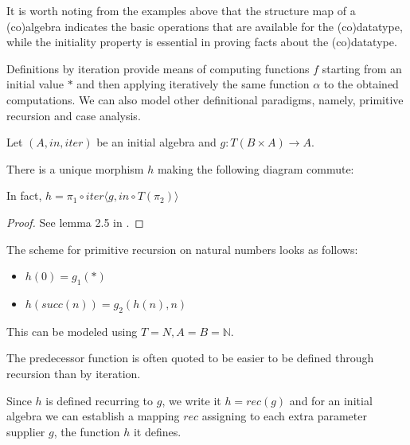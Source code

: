 It is worth noting from the examples above that the structure map of a (co)algebra indicates the basic operations that are available for the (co)datatype, while the initiality property is essential in proving facts about the (co)datatype. \cite{smyth1982category}

Definitions by iteration provide means of computing functions $f$ starting from an initial value $*$ and then applying iteratively the same function $\alpha$ to the obtained computations. We can also model other definitional paradigms, namely, primitive recursion and case analysis. 

\begin{lemma}
	Let $(A,in,iter)$ be an initial algebra and $g: T(B\times A) \to A$. 
	
	There is a unique morphism $h$ making the following diagram commute:
	

	In fact, $h = \pi_1 \circ iter\langle g, in \circ T(\pi_2)\rangle$
\end{lemma}
\begin{proof}
	See lemma 2.5 in \cite{geuvers2007iteration}.
\end{proof}

\begin{example}
The scheme for primitive recursion on natural numbers looks as follows:

\begin{itemize}
	\item $h(0) = g_1(*)$
	\item $h(succ(n)) = g_2(h(n), n)$ 
\end{itemize}

This can be modeled using $T = N, A = B = \mathbb{N}$. 

The predecessor function is often quoted to be easier to be defined through recursion than by iteration.
\end{example}

Since $h$ is defined recurring to $g$, we write it $h = rec(g)$ and for an initial algebra we can establish a mapping $rec$ assigning to each extra parameter supplier $g$, the function $h$ it defines.

